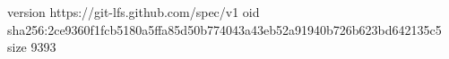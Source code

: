 version https://git-lfs.github.com/spec/v1
oid sha256:2ce9360f1fcb5180a5ffa85d50b774043a43eb52a91940b726b623bd642135c5
size 9393
